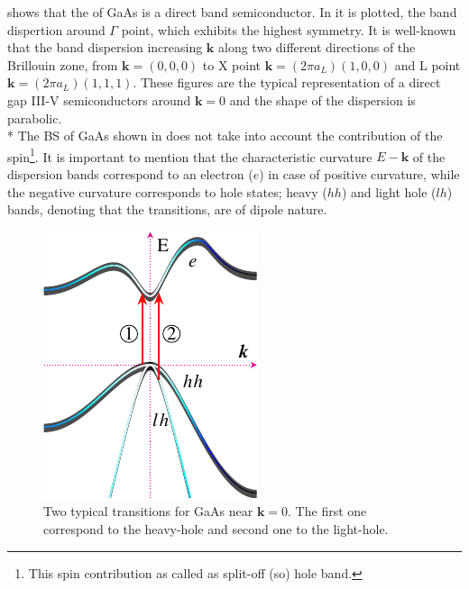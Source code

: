  shows that the of  GaAs is a direct band semiconductor. In  it is plotted, the band dispertion around $\Gamma$ point, which exhibits the highest symmetry.  It is well-known that the band dispersion increasing $\boldsymbol{k}$ along two different directions of the Brillouin zone, from $\boldsymbol{k}=(0,0,0)$ to X point $\boldsymbol{k}=(2\pi a_{L})(1,0,0)$ and L point $\boldsymbol{k}=(2\pi a_{L})(1,1,1)$. These figures are the typical representation of a direct gap III-V semiconductors around  $\boldsymbol{k}=0$ and the shape of the dispersion is parabolic.\\* The BS of GaAs shown in  does not take into account the contribution of the spin\footnote{This spin contribution as called as split-off (so) hole band.}.  It is important to mention that the characteristic curvature $E\!\!-\!\!\boldsymbol{k}$ of the dispersion bands correspond to an electron ($e$) in case of positive curvature, while the negative curvature corresponds to hole states; heavy ($hh$) and light hole ($lh$) bands, denoting that the transitions, are of dipole nature\cite{fox2002optical,cardona2005fundamentals}. \\
\begin{figure}[h!]
	\centering
		\includegraphics[width=0.5\linewidth]{../figures/chapter-1/bands/build/bands02}
	\caption{Two typical transitions for GaAs near $\boldsymbol{k}=0$. The first one correspond to the heavy-hole and second one to the light-hole. }
	\label{fig:subsubsection-1.1.1-GaAsbands-2}
\end{figure}
